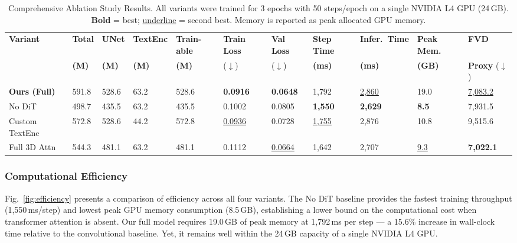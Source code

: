 \documentclass{ieeeaccess}
\begin{document}
\begin{table}[t]
    \centering
    \caption{Comprehensive Ablation Study Results. All variants were trained for 3 epochs with 50 steps/epoch on a single NVIDIA L4 GPU (24\,GB). \textbf{Bold} = best; \underline{underline} = second best. Memory is reported as peak allocated GPU memory.}
    \label{tab:ablation_main}
    \renewcommand{\arraystretch}{1.2}
    \setlength{\tabcolsep}{5pt}
    \begin{tabular}{@{} l C{1cm} C{1cm} C{1cm} C{1.1cm} C{1.1cm} C{1cm} C{1cm} C{1cm} C{1cm} C{1cm} @{}}
        \toprule
        \textbf{Variant} & \textbf{Total} & \textbf{UNet} & \textbf{TextEnc} & \textbf{Train-able} & \textbf{Train Loss} & \textbf{Val Loss} & \textbf{Step Time} & \textbf{Infer.\ Time} & \textbf{Peak Mem.} & \textbf{FVD} \\
        & \textbf{(M)} & \textbf{(M)} & \textbf{(M)} & \textbf{(M)} & ($\downarrow$) & ($\downarrow$) & \textbf{(ms)} & \textbf{(ms)} & \textbf{(GB)} & \textbf{Proxy} ($\downarrow$) \\
        \midrule
        \textbf{Ours (Full)} & 591.8 & 528.6 & 63.2 & 528.6 & \textbf{0.0916} & \textbf{0.0648} & 1{,}792 & \underline{2{,}860} & 19.0 & \underline{7{,}083.2} \\
        No DiT & 498.7 & 435.5 & 63.2 & 435.5 & 0.1002 & 0.0805 & \textbf{1{,}550} & \textbf{2{,}629} & \textbf{8.5} & 7{,}931.5 \\
        Custom TextEnc & 572.8 & 528.6 & 44.2 & 572.8 & \underline{0.0936} & 0.0728 & \underline{1{,}755} & 2{,}876 & 10.8 & 9{,}515.6 \\
        Full 3D Attn & 544.3 & 481.1 & 63.2 & 481.1 & 0.1112 & \underline{0.0664} & 1{,}642 & 2{,}707 & \underline{9.3} & \textbf{7{,}022.1} \\
        \bottomrule
    \end{tabular}
\end{table}

\subsubsection{Computational Efficiency}

Fig.~\ref{fig:efficiency} presents a comparison of efficiency across all four variants. The No DiT baseline provides the fastest training throughput (1,550\,ms/step) and lowest peak GPU memory consumption (8.5\,GB), establishing a lower bound on the computational cost when transformer attention is absent. Our full model requires 19.0\,GB of peak memory at 1,792\,ms per step — a 15.6\% increase in wall-clock time relative to the convolutional baseline. Yet, it remains well within the 24\,GB capacity of a single NVIDIA L4 GPU.
\end{document}
